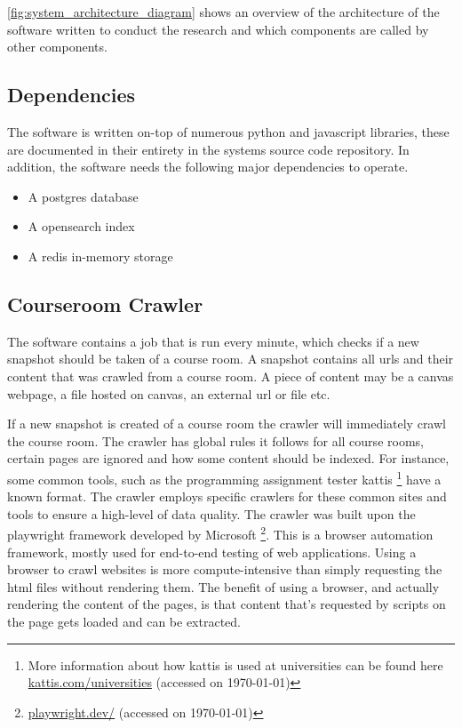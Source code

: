 \autoref{fig:system_architecture_diagram} shows an overview of the architecture of the software written to conduct the research and which components are called by other components.





\subsection{Dependencies}


The software is written on-top of numerous python and javascript libraries, these are documented in their entirety in the systems source code repository. In addition, the software needs the following major dependencies to operate.


\begin{itemize}
        \item A postgres database
        \item A opensearch index
        \item A redis in-memory storage
\end{itemize}


\subsection{Courseroom Crawler}


The software contains a job that is run every minute, which checks if a new snapshot should be taken of a course room. A snapshot contains all urls and their content that was crawled from a course room. A piece of content may be a canvas webpage, a file hosted on canvas, an external url or file etc.


If a new snapshot is created of a course room the crawler will immediately crawl the course room. The crawler has global rules it follows for all course rooms, certain pages are ignored and how some content should be indexed. For instance, some common tools, such as the programming assignment tester kattis \footnote{More information about how kattis is used at universities can be found here \href{https://www.kattis.com/universities}{kattis.com/universities} (accessed on \today)} have a known format. The crawler employs specific crawlers for these common sites and tools to ensure a high-level of data quality.
The crawler was built upon the playwright framework developed by Microsoft \footnote{\href{https://playwright.dev/}{playwright.dev/} (accessed on \today)}. This is a browser automation framework, mostly used for end-to-end testing of web applications. Using a browser to crawl websites is more compute-intensive than simply requesting the html files without rendering them. The benefit of using a browser, and actually rendering the content of the pages, is that content that’s requested by scripts on the page gets loaded and can be extracted.



